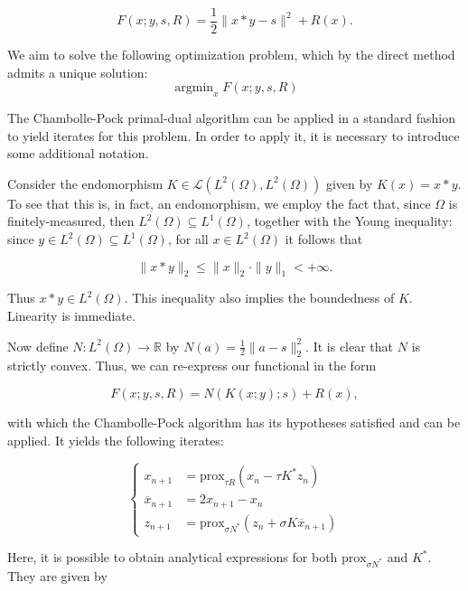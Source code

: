 \documentclass{article}
\DeclareMathOperator*{\argmin}{\operatorname*{argmin}}
\begin{document}
\[
  F(x; y, s, R) = \frac12\|x\ast y - s\|^2 + R(x)
.\]

We aim to solve the following optimization problem, which by the direct method admits a unique solution:
\begin{equation}\label{eq:minimization_problem}
  \argmin_{x} F(x; y, s, R)
\end{equation}

The Chambolle-Pock primal-dual algorithm can be applied in a standard fashion to yield iterates for this problem. In order to apply it, it is necessary to introduce some additional notation.

Consider the endomorphism \(K\in \mathcal{L}\left(L^2(\Omega), L^2(\Omega)\right)\) given by \(K(x)=x\ast y\). To see that this is, in fact, an endomorphism, we employ the fact that, since \(\Omega\) is finitely-measured, then \(L^2(\Omega)\subseteq L^1(\Omega)\), together with the Young inequality: since \(y\in L^2(\Omega)\subseteq L^1(\Omega)\), for all \(x\in L^2(\Omega)\) it follows that

\[
  \|x\ast y\|_{2} \leq \|x\|_{2}\cdot\|y\|_{1} < +\infty
.\]

Thus \(x\ast y \in L^2(\Omega)\). This inequality also implies the boundedness of \(K\). Linearity is immediate.

Now define \(N\colon L^2(\Omega)\to\mathbb{R}\) by \(N(a)=\frac12\|a - s\|_{2}^2\). It is clear that \(N\) is strictly convex. Thus, we can re-express our functional in the form

\begin{equation}\label{eq:functional}
  F(x; y, s, R) = N(K(x; y); s) + R(x),
\end{equation}

with which the Chambolle-Pock algorithm has its hypotheses satisfied and can be applied. It yields the following iterates:

\begin{equation}
  \left\{
  \begin{split}
    x_{n+1} & = \text{prox}_{\tau R}(x_n - \tau K^*z_n) \\
    \overline{x}_{n+1} & = 2x_{n+1} - x_n \\
    z_{n+1} & = \text{prox}_{\sigma N^*}(z_n + \sigma K\overline{x}_{n+1})
  \end{split}
  \right.
\end{equation}

Here, it is possible to obtain analytical expressions for both \(\text{prox}_{\sigma N^*}\) and \(K^*\). They are given by
\end{document}
